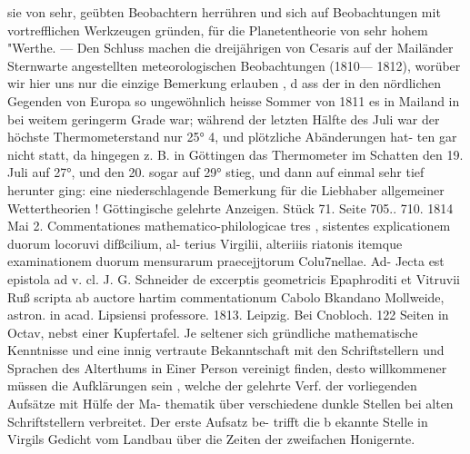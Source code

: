 \documentclass[12pt,a4paper]{article}
\begin{document}
sie von sehr, geübten Beobachtern herrühren und sich auf Beobachtungen mit vortrefflichen Werkzeugen\newline
gründen, für die Planetentheorie von sehr hohem "Werthe. --- Den Schluss machen die dreijährigen von\newline
Cesaris auf der Mailänder Sternwarte angestellten meteorologischen Beobachtungen (1810--- 1812), worüber\newline
wir hier uns nur die einzige Bemerkung erlauben , d ass der in den nördlichen Gegenden von Europa so\newline
ungewöhnlich heisse Sommer von 1811 es in Mailand in bei weitem geringerm Grade war; während der\newline
letzten Hälfte des Juli war der höchste Thermometerstand nur 25° 4, und plötzliche Abänderungen hat-\newline
ten gar nicht statt, da hingegen z. B. in Göttingen das Thermometer im Schatten den 19. Juli auf 27°,\newline
und den 20. sogar auf 29° stieg, und dann auf einmal sehr tief herunter ging: eine niederschlagende\newline
Bemerkung für die Liebhaber allgemeiner Wettertheorien !\newline
Göttingische gelehrte Anzeigen. Stück 71. Seite 705.. 710. 1814 Mai 2.\newline
Commentationes mathematico-philologicae tres , sistentes explicationem duorum locoruvi difßcilium, al-\newline
terius Virgilii, alteriiis riatonis itemque examinationem duorum mensurarum praecejjtorum Colu7nellae. Ad-\newline
Jecta est epistola ad v. cl. J. G. Schneider de excerptis geometricis Epaphroditi et Vitruvii Ruß scripta ab\newline
auctore hartim commentationum Cabolo Bkandano Mollweide, astron. in acad. Lipsiensi professore. 1813.\newline
Leipzig. Bei Cnobloch. 122 Seiten in Octav, nebst einer Kupfertafel.\newline
Je seltener sich gründliche mathematische Kenntnisse und eine innig vertraute Bekanntschaft mit\newline
den Schriftstellern und Sprachen des Alterthums in Einer Person vereinigt finden, desto willkommener\newline
müssen die Aufklärungen sein , welche der gelehrte Verf. der vorliegenden Aufsätze mit Hülfe der Ma-\newline
thematik über verschiedene dunkle Stellen bei alten Schriftstellern verbreitet. Der erste Aufsatz be-\newline
trifft die b ekannte Stelle in Virgils Gedicht vom Landbau über die Zeiten der zweifachen Honigernte.\newline
\end{document}

